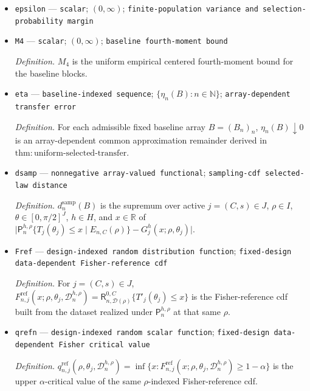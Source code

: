 \documentclass{article}
\begin{document}
\begin{itemize}
  \par\smallskip\noindent\emph{Definition.} \(\mathcal{S}^{\star}=\{(\rho,(\theta_j)_{j\in J}):\min_{j\in J}\Pi_j(\rho,\theta_j,\ell_s)=V^{\star}\}\)
  \item \texttt{epsilon} --- \texttt{scalar}; \((0,\infty)\); \texttt{finite-\allowbreak{}population variance and selection-\allowbreak{}probability margin}
  \item \texttt{M4} --- \texttt{scalar}; \((0,\infty)\); \texttt{baseline fourth-\allowbreak{}moment bound}
  \par\smallskip\noindent\emph{Definition.} \(M_4\) is the uniform empirical centered fourth-moment bound for the baseline blocks.
  \item \texttt{eta} --- \texttt{baseline-\allowbreak{}indexed sequence}; \(\{\eta_n(B):n\in\mathbb N\}\); \texttt{array-\allowbreak{}dependent transfer error}
  \par\smallskip\noindent\emph{Definition.} For each admissible fixed baseline array \(B=(B_n)_n\), \(\eta_n(B)\downarrow0\) is an array-dependent common approximation remainder derived in \(\mathrm{thm{:}uniform\mbox{-}selected\mbox{-}transfer}\).
  \item \texttt{dsamp} --- \texttt{nonnegative array-\allowbreak{}valued functional}; \texttt{sampling-\allowbreak{}cdf selected-\allowbreak{}law distance}
  \par\smallskip\noindent\emph{Definition.} \(d^{\mathrm{samp}}_n(B)\) is the supremum over active \(j=(C,s)\in J\), \(\rho\in I\), \(\theta\in[0,\pi/2]^J\), \(h\in H\), and \(x\in\mathbb R\) of \(\lvert\mathsf P_n^{h,\rho}\{T_j(\theta_j)\le x\mid E_{n,C}(\rho)\}-G^h_j(x;\rho,\theta_j)\rvert\).
  \item \texttt{Fref} --- \texttt{design-\allowbreak{}indexed random distribution function}; \texttt{fixed-\allowbreak{}design data-\allowbreak{}dependent Fisher-\allowbreak{}reference cdf}
  \par\smallskip\noindent\emph{Definition.} For \(j=(C,s)\in J\), \(F^{\mathrm{ref}}_{n,j}(x;\rho,\theta_j,\mathcal D_n^{h,\rho})=\mathsf R_{n,\mathcal D(\rho)}^{0,C}\{T'_j(\theta_j)\le x\}\) is the Fisher-reference cdf built from the dataset realized under \(\mathsf P_n^{h,\rho}\) at that same \(\rho\).
  \item \texttt{qrefn} --- \texttt{design-\allowbreak{}indexed random scalar function}; \texttt{fixed-\allowbreak{}design data-\allowbreak{}dependent Fisher critical value}
  \par\smallskip\noindent\emph{Definition.} \(q^{\mathrm{ref}}_{n,j}(\rho,\theta_j,\mathcal D_n^{h,\rho})=\inf\{x:F^{\mathrm{ref}}_{n,j}(x;\rho,\theta_j,\mathcal D_n^{h,\rho})\ge1-\alpha\}\) is the upper \(\alpha\)-critical value of the same \(\rho\)-indexed Fisher-reference cdf.

\end{itemize}
\end{document}
